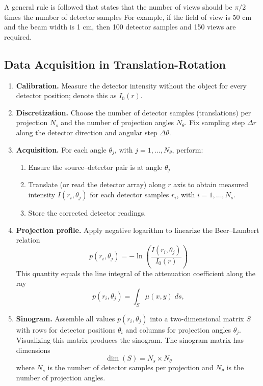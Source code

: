 \documentclass[../../../main.tex]{subfiles}
\begin{document}
A general rule is followed that states that the number of views should be $\pi/2$ times the number of detector samples
For example, if the field of view is 50 cm and the beam width is 1 cm, then 100 detector samples and 150 views are required.

\subsection{Data Acquisition in Translation-Rotation}
\begin{enumerate}
    \item \textbf{Calibration.} Measure the detector intensity without the object for every detector position; denote this as $I_0(r)$.
    \item \textbf{Discretization.} Choose the number of detector samples (translations) per projection $N_s$ and the number of projection angles $N_\theta$. Fix sampling step $\Delta r$ along the detector direction and angular step $\Delta \theta$.
    \item \textbf{Acquisition.} For each angle $\theta_j$, with $j=1,\dots,N_\theta$, perform:
          \begin{enumerate}
              \item Ensure the source–detector pair is at angle $\theta_j$
              \item Translate (or read the detector array) along $r$ axis to obtain measured intensity $I(r_i,\theta_j)$ for each detector samples $r_i$, with $i=1,\dots,N_s$.
              \item Store the corrected detector readings.
          \end{enumerate}
    \item \textbf{Projection profile.} Apply negative logarithm to linearize the Beer–Lambert relation
          \begin{equation*}
              p(r_i,\theta_j)=-\ln \left( \frac{I(r_i,\theta_j)}{I_0(r)} \right)
          \end{equation*}
          This quantity equals the line integral of the attenuation coefficient along the ray
          \begin{equation*}
              p(r_i,\theta_j)
              = \int_{S} \mu(x,y) \; ds,
          \end{equation*}
    \item \textbf{Sinogram.} Assemble all values $p(r_i,\theta_j)$ into a two-dimensional matrix $S$ with rows for detector positions $\theta_i$ and columns for projection angles $\theta_j$. Visualizing this matrix produces the sinogram. The sinogram matrix has dimensions
          \begin{equation*}
              \dim (S)=N_s\times N_\theta
          \end{equation*}
          where $N_s$ is the number of detector samples per projection and $N_\theta$ is the number of projection angles.
\end{enumerate}
\end{document}
